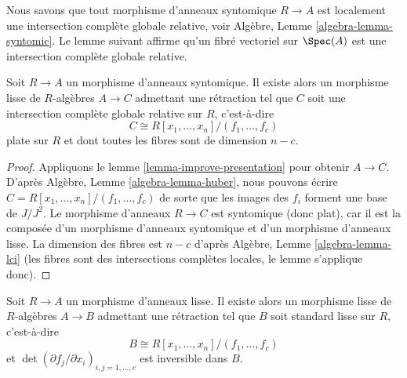\noindent
Nous savons que tout morphisme d'anneaux syntomique $R \to A$ est localement
une intersection complète globale relative, voir
Algèbre, Lemme \ref{algebra-lemma-syntomic}.
Le lemme suivant affirme qu'un fibré vectoriel sur $\Spec(A)$ est une
intersection complète globale relative.

\begin{lemma}
\label{lemma-syntomic-complete-intersection}
Soit $R \to A$ un morphisme d'anneaux syntomique. Il existe alors un morphisme
lisse de $R$-algèbres $A \to C$ admettant une rétraction tel que $C$ soit une
intersection complète globale relative sur $R$, c'est-à-dire
$$
C \cong R[x_1, \ldots, x_n]/(f_1, \ldots, f_c)
$$
plate sur $R$ et dont toutes les fibres sont de dimension $n - c$.
\end{lemma}

\begin{proof}
Appliquons le lemme \ref{lemma-improve-presentation} pour obtenir $A \to C$.
D'après Algèbre, Lemme \ref{algebra-lemma-huber}, nous pouvons écrire
$C = R[x_1, \ldots, x_n]/(f_1, \ldots, f_c)$ de sorte que les images des $f_i$
forment une base de $J/J^2$.
Le morphisme d'anneaux $R \to C$ est syntomique (donc plat), car il est la
composée d'un morphisme d'anneaux syntomique et d'un morphisme d'anneaux lisse.
La dimension des fibres est $n - c$ d'après
Algèbre, Lemme \ref{algebra-lemma-lci}
(les fibres sont des intersections complètes locales, le lemme s'applique donc).
\end{proof}

\begin{lemma}
\label{lemma-smooth-standard-smooth}
Soit $R \to A$ un morphisme d'anneaux lisse. Il existe alors un morphisme lisse
de $R$-algèbres $A \to B$ admettant une rétraction tel que $B$ soit standard
lisse sur $R$, c'est-à-dire
$$
B \cong R[x_1, \ldots, x_n]/(f_1, \ldots, f_c)
$$
et $\det(\partial f_j/\partial x_i)_{i, j = 1, \ldots, c}$ est inversible dans
$B$.
\end{lemma}

